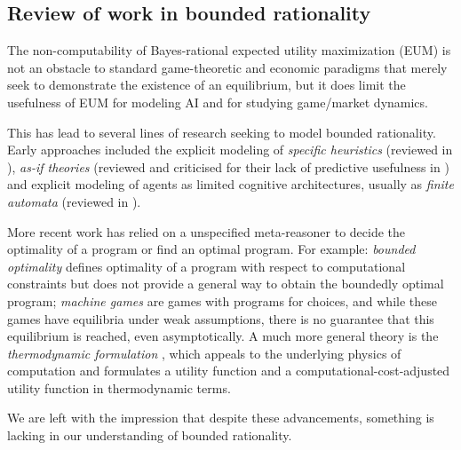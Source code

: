 \subsection{Review of work in bounded rationality}

The non-computability of Bayes-rational expected utility maximization (EUM) is not an obstacle to standard game-theoretic and economic paradigms that merely seek to demonstrate the existence of an equilibrium, but it does limit the usefulness of EUM for modeling AI and for studying game/market dynamics.

This has lead to several lines of research seeking to model bounded rationality. Early approaches included the explicit modeling of \emph{specific heuristics} (reviewed in \cite{oldreview_heuristics}), \emph{as-if theories} (reviewed and criticised for their lack of predictive usefulness in \cite{norationalization_friedman}) and explicit modeling of agents as limited cognitive architectures, usually as \emph{finite automata} (reviewed in \cite{oldreview_aumann}). 

More recent work has relied on a unspecified meta-reasoner to decide the optimality of a program or find an optimal program. For example: \emph{bounded optimality} \cite{bounded_optimality_LHS, bounded_optimality_RS, bounded_optimality_zilberstein}  defines optimality of a program with respect to computational constraints but does not provide a general way to obtain the boundedly optimal program; \emph{machine games} \cite{halpern_game, halpern_choice, tennenholtz} are games with programs for choices, and while these games have equilibria under weak assumptions, there is no guarantee that this equilibrium is reached, even asymptotically. A much more general theory is the \emph{thermodynamic formulation} \cite{thermo_info, thermo_thermo, thermo_main}, which appeals to the underlying physics of computation and formulates a utility function and a computational-cost-adjusted utility function in thermodynamic terms.

We are left with the impression that despite these advancements, something is lacking in our understanding of bounded rationality. 

